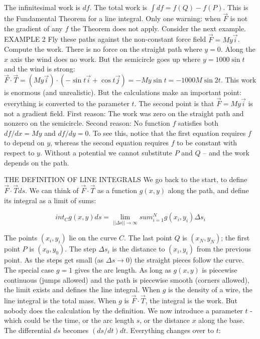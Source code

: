 The infinitesimal work is $df$. The total work is $\int df= f(Q) - f (P)$. This is the Fundamental
Theorem for a line integral. Only one warning: when $\vec F$ is not the gradient of any
$f$ the Theorem does not apply. Consider the next example.
EXAMPLE 2 Fly these paths against the non-constant force field $\vec F = My\vec i$. Compute
the work.
There is no force on the straight path where $y = 0$. Along the $x$ axis the wind does
no work. But the semicircle goes up where $y = 1000 \sin t$ and the wind is strong:
$\vec F \cdot \vec T=(My \vec i)\cdot(-\sin t \vec i+\cos t \vec j)= -My \sin t= - 1000M \sin 2t$.
This work is enormous (and unrealistic). But the calculations make an important
point: everything is converted to the parameter $t$. The second point is that $\vec F = My \vec i$
is not a gradient field. First reason: The work was zero on the straight path and 
nonzero on the semicircle. Second reason: No function $f$ satisfies both $df/ dx = My$ and $df /dy =
0$. To see this, notice that the first equation requires $f$ to depend on $y$, whereas the second equation requires $f$ to be constant with respect to $y$. Without a potential we cannot substitute $P$ and $Q$ -- and the work depends
on the path.

THE DEFINITION OF LINE INTEGRALS
We go back to the start, to define $\vec F \cdot \vec T ds$. We can think of $\vec F \cdot \vec T$ as a function $g(x, y)$
along the path, and define its integral as a limit of sums:

\begin{definition}
 $$int_C g(x,y)ds = \lim_{||\Delta s||\to\infty} sum_{i=1}^N g(x_i,y_i)\Delta s_i$$
\end{definition}

The points $(x_i, y_i)$ lie on the curve $C$. The last point $Q$ is $(x_N, y_N)$; the first point $P$ is
$(x_0, y_0)$. The step $\Delta s_i$ is the distance to $(x_i, y_i)$ from the previous point. As the steps
get small (as $\Delta s \to 0$) the straight pieces follow the curve. The
special case $g = 1$ gives the arc length. As long as $g(x, y)$ is piecewise continuous
(jumps allowed) and the path is piecewise smooth (corners allowed), the limit exists
and defines the line integral.
When $g$ is the density of a wire, the line integral is the total mass. When $g$ is $\vec F \cdot \vec T$,
the integral is the work. But nobody does the calculation by the definition. We now
introduce a parameter $t$ - which could be the time, or the arc length $s$, or the distance
$x$ along the base.
The differential $ds$ becomes $(ds/dt)dt$. Everything changes over to $t$:

